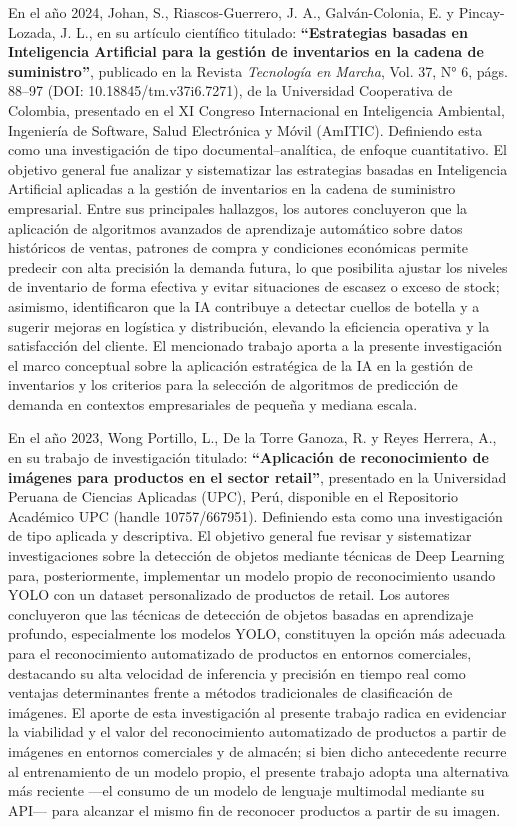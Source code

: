 \documentclass[12pt, letterpaper]{report}
\begin{document}
En el año 2024, Johan, S., Riascos-Guerrero, J. A., Galván-Colonia, E.
y Pincay-Lozada, J. L., en su artículo científico titulado:
\textbf{``Estrategias basadas en Inteligencia Artificial para la gestión
de inventarios en la cadena de suministro''}, publicado en la Revista
\textit{Tecnología en Marcha}, Vol. 37, N° 6, págs. 88--97 (DOI:
10.18845/tm.v37i6.7271), de la Universidad Cooperativa de Colombia,
presentado en el XI Congreso Internacional en Inteligencia Ambiental,
Ingeniería de Software, Salud Electrónica y Móvil (AmITIC). Definiendo
esta como una investigación de tipo documental--analítica, de enfoque
cuantitativo. El objetivo general fue analizar y sistematizar las
estrategias basadas en Inteligencia Artificial aplicadas a la gestión
de inventarios en la cadena de suministro empresarial. Entre sus
principales hallazgos, los autores concluyeron que la aplicación de
algoritmos avanzados de aprendizaje automático sobre datos históricos
de ventas, patrones de compra y condiciones económicas permite predecir
con alta precisión la demanda futura, lo que posibilita ajustar los
niveles de inventario de forma efectiva y evitar situaciones de escasez
o exceso de stock; asimismo, identificaron que la IA contribuye a
detectar cuellos de botella y a sugerir mejoras en logística y
distribución, elevando la eficiencia operativa y la satisfacción del
cliente. El mencionado trabajo aporta a la presente investigación el
marco conceptual sobre la aplicación estratégica de la IA en la gestión
de inventarios y los criterios para la selección de algoritmos de
predicción de demanda en contextos empresariales de pequeña y mediana
escala.

En el año 2023, Wong Portillo, L., De la Torre Ganoza, R. y Reyes
Herrera, A., en su trabajo de investigación titulado:
\textbf{``Aplicación de reconocimiento de imágenes para productos en el
sector retail''}, presentado en la Universidad Peruana de Ciencias
Aplicadas (UPC), Perú, disponible en el Repositorio Académico UPC
(handle 10757/667951). Definiendo esta como una investigación de tipo
aplicada y descriptiva. El objetivo general fue revisar y sistematizar
investigaciones sobre la detección de objetos mediante técnicas de Deep
Learning para, posteriormente, implementar un modelo propio de
reconocimiento usando YOLO con un dataset personalizado de productos
de retail. Los autores concluyeron que las técnicas de detección de
objetos basadas en aprendizaje profundo, especialmente los modelos
YOLO, constituyen la opción más adecuada para el reconocimiento
automatizado de productos en entornos comerciales, destacando su alta
velocidad de inferencia y precisión en tiempo real como ventajas
determinantes frente a métodos tradicionales de clasificación de
imágenes. El aporte de esta investigación al presente trabajo radica
en evidenciar la viabilidad y el valor del reconocimiento automatizado
de productos a partir de imágenes en entornos comerciales y de almacén;
si bien dicho antecedente recurre al entrenamiento de un modelo propio,
el presente trabajo adopta una alternativa más reciente ---el consumo
de un modelo de lenguaje multimodal mediante su API--- para alcanzar el
mismo fin de reconocer productos a partir de su imagen.
\end{document}
